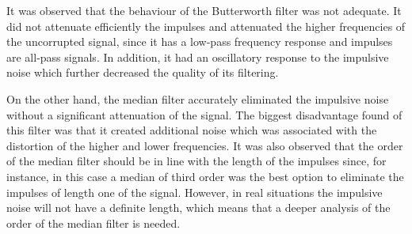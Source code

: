 \documentclass[a4paper, oneside, 11pt]{article}
\begin{document}
It was observed that the behaviour of the Butterworth filter was not adequate. It did not attenuate efficiently the impulses and attenuated the higher frequencies of the uncorrupted signal, since it has a low-pass frequency response and impulses are all-pass signals. In addition, it had an oscillatory response to the impulsive noise which further decreased the quality of its filtering.

On the other hand, the median filter accurately eliminated the impulsive noise without a significant attenuation of the signal. The biggest disadvantage found of this filter was that it created additional noise which was associated with the distortion of the higher and lower frequencies. It was also observed that the order of the median filter should be in line with the length of the impulses since, for instance, in this case a median of third order was the best option to eliminate the impulses of length one of the signal. However, in real situations the impulsive noise will not have a definite length, which means that a deeper analysis of the order of the median filter is needed.
\end{document}
